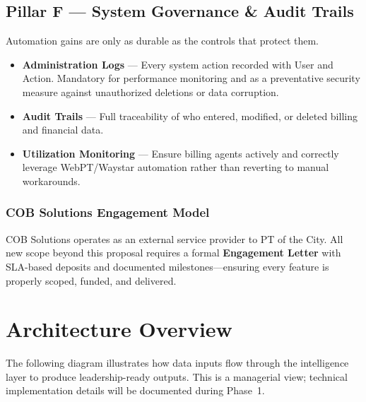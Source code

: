 \documentclass[11pt,a4paper]{article}
\begin{document}
\subsection{Pillar F --- System Governance \& Audit Trails}
\label{sec:governance}

Automation gains are only as durable as the controls that protect them.

\begin{itemize}
  \item \textbf{Administration Logs} --- Every system action recorded with User and Action.
        Mandatory for performance monitoring and as a preventative security measure
        against unauthorized deletions or data corruption.
  \item \textbf{Audit Trails} --- Full traceability of who entered, modified, or deleted
        billing and financial data.
  \item \textbf{Utilization Monitoring} --- Ensure billing agents actively and correctly
        leverage WebPT/Waystar automation rather than reverting to manual workarounds.
\end{itemize}

\subsubsection{COB Solutions Engagement Model}

COB Solutions operates as an external service provider to PT of the City. All new scope
beyond this proposal requires a formal \textbf{Engagement Letter} with SLA-based deposits
and documented milestones---ensuring every feature is properly scoped, funded, and delivered.


\section{Architecture Overview}

The following diagram illustrates how data inputs flow through the intelligence layer
to produce leadership-ready outputs. This is a managerial view; technical implementation
details will be documented during Phase~1.
\end{document}
